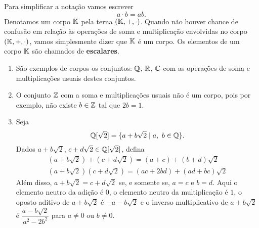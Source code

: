 Para simplificar a nota\c{c}\~ao vamos escrever
\[
  a \cdot b = ab.
\]
Denotamos um corpo $\mathbb{K}$ pela terna $(\mathbb{K}, +, \cdot)$. Quando n\~ao houver chance de confus\~ao em rela\c{c}\~ao \`as opera\c{c}\~oes de soma e multiplica\c{c}\~ao envolvidas no corpo $(\mathbb{K}, +, \cdot)$, vamos simplesmente dizer que $\mathbb{K}$ \'e um corpo. Os elementos de um corpo $\mathbb{K}$ s\~ao chamados de \textbf{escalares}.

\begin{exemplo}
	\begin{enumerate}
		\item S\~ao exemplos de corpos os conjuntos: $\mathbb{Q}$, $\mathbb{R}$, $\mathbb{C}$ com as opera\c{c}\~oes de soma e multiplica\c{c}\~oes usuais destes conjuntos.
		
		\item O conjunto $\mathbb{Z}$ com a soma e multiplica\c{c}\~oes usuais n\~ao \'e um corpo, pois por exemplo, n\~ao existe $b \in \mathbb{Z}$ tal que $2b = 1$.
		
		\item Seja
			\[
			  \mathbb{Q}{[\sqrt{2}]} = \{a + b\sqrt{2} \mid a,\ b \in \mathbb{Q}\}.
			\]
			Dados $a + b\sqrt{2}$, $c + d\sqrt{2} \in \mathbb{Q}{[\sqrt{2}]}$, defina
			\begin{align*}
				(a + b\sqrt{2}) + (c + d\sqrt{2}) = (a + c) + (b + d)\sqrt{2}\\
				(a + b\sqrt{2})(c + d\sqrt{2}) = (ac + 2bd) + (ad + bc)\sqrt{2}
			\end{align*}
			Al\'em disso, $a + b\sqrt{2} = c + d\sqrt{2}$ se, e somente se, $a = c$ e $b = d$.
			Aqui o elemento neutro da adi\c{c}\~ao \'e $0$, o elemento neutro da multiplica\c{c}\~ao \'e $1$, o oposto aditivo de $a + b\sqrt{2}$ \'e $-a - b\sqrt{2}$ e o inverso multiplicativo de $a + b\sqrt{2}$ \'e $\dfrac{a - b\sqrt{2}}{a^2 - 2b^2}$ para $a \ne 0$ ou $b \ne 0$.

	\end{enumerate}
\end{exemplo}

